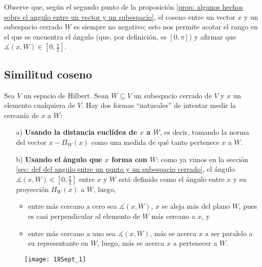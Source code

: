 \QEDB
\vspace{0.2cm}

\begin{nota}
Observe que, según el segundo punto de la proposición 
\ref{prop: algunos hechos sobre el angulo entre un vector y un subespacio}, 
el coseno entre un vector $x$ y un subespacio cerrado $W$ es
siempre no negativo; esto nos permite acotar el rango en el que
se encuentra el ángulo (que, por definición, es $[0, \pi]$)
y afirmar que $\measuredangle(x, W) \in [0, \frac{\pi}{2}]$.
\end{nota}

\subsection{Similitud coseno}
\label{cosine similarity}

Sea $V$ un espacio de Hilbert.
Sean $W \subseteq V$ un subespacio cerrado de $V$ y 
$x$ un elemento cualquiera de $V$. Hay dos formas ``naturales''
de intentar medir la cercanía de $x$ a $W$:
\begin{itemize}
\item[a)] \textbf{Usando la distancia euclídea
de $x$ a $W$}, es decir, tomando la norma del vector
$x - \Pi_{W}(x)$ como una medida
de qué tanto pertenece $x$ a $W$.
\item[b)] \textbf{Usando el ángulo que $x$ forma con $W$}: como ya
vimos en la sección 
\ref{sec: def del angulo entre un punto y un subespacio cerrado}, el ángulo 
$\measuredangle (x, W) \in [0, \frac{\pi}{2}]$
entre $x$ y $W$
está definido como el ángulo entre $x$ y su proyección
$\Pi_{W}(x)$ a $W$, luego, 
	\begin{itemize}
		\item entre más cercano a cero sea $\measuredangle (x, W)$,
		$x$ se aleja más del plano $W$, pues es casi perpendicular 
		al elemento de $W$ más cercano a $x$, y
		
		\item entre más cercano a uno sea $\measuredangle (x, W)$,
		más se acerca $x$ a ser paralelo a su representante en $W$,
		luego, más se acerca $x$ a pertenecer a $W$.
	\end{itemize}
\end{itemize}

\begin{figure}[H]
	\centering
	\texttt{[image: 18Sept\_1]} 
\end{figure}	

